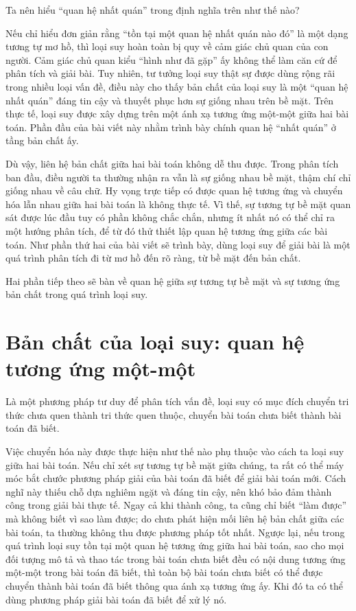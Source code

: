\documentclass[11pt]{article}
\begin{document}
Ta nên hiểu ``quan hệ nhất quán'' trong định nghĩa trên như thế nào?

Nếu chỉ hiểu đơn giản rằng ``tồn tại một quan hệ nhất quán nào đó'' là một
dạng tương tự mơ hồ, thì loại suy hoàn toàn bị quy về cảm giác chủ quan của
con người. Cảm giác chủ quan kiểu ``hình như đã gặp'' ấy không thể làm căn cứ
để phân tích và giải bài. Tuy nhiên, tư tưởng loại suy thật sự được dùng rộng
rãi trong nhiều loại vấn đề, điều này cho thấy bản chất của loại suy là một
``quan hệ nhất quán'' đáng tin cậy và thuyết phục hơn sự giống nhau trên bề
mặt. Trên thực tế, loại suy được xây dựng trên một ánh xạ tương ứng một-một
giữa hai bài toán. Phần đầu của bài viết này nhằm trình bày chính quan hệ
``nhất quán'' ở tầng bản chất ấy.

Dù vậy, liên hệ bản chất giữa hai bài toán không dễ thu được. Trong phân tích
ban đầu, điều người ta thường nhận ra vẫn là sự giống nhau bề mặt, thậm chí
chỉ giống nhau về câu chữ. Hy vọng trực tiếp có được quan hệ tương ứng và
chuyển hóa lẫn nhau giữa hai bài toán là không thực tế. Vì thế, sự tương tự
bề mặt quan sát được lúc đầu tuy có phần không chắc chắn, nhưng ít nhất nó có
thể chỉ ra một hướng phân tích, để từ đó thử thiết lập quan hệ tương ứng giữa
các bài toán. Như phần thứ hai của bài viết sẽ trình bày, dùng loại suy để
giải bài là một quá trình phân tích đi từ mơ hồ đến rõ ràng, từ bề mặt đến
bản chất.

Hai phần tiếp theo sẽ bàn về quan hệ giữa sự tương tự bề mặt và sự tương ứng
bản chất trong quá trình loại suy.

\section{Bản chất của loại suy: quan hệ tương ứng một-một}

Là một phương pháp tư duy để phân tích vấn đề, loại suy có mục đích chuyển tri
thức chưa quen thành tri thức quen thuộc, chuyển bài toán chưa biết thành bài
toán đã biết.

Việc chuyển hóa này được thực hiện như thế nào phụ thuộc vào cách ta loại suy
giữa hai bài toán. Nếu chỉ xét sự tương tự bề mặt giữa chúng, ta rất có thể
máy móc bắt chước phương pháp giải của bài toán đã biết để giải bài toán mới.
Cách nghĩ này thiếu chỗ dựa nghiêm ngặt và đáng tin cậy, nên khó bảo đảm
thành công trong giải bài thực tế. Ngay cả khi thành công, ta cũng chỉ biết
``làm được'' mà không biết vì sao làm được; do chưa phát hiện mối liên hệ bản
chất giữa các bài toán, ta thường không thu được phương pháp tốt nhất. Ngược
lại, nếu trong quá trình loại suy tồn tại một quan hệ tương ứng giữa hai bài
toán, sao cho mọi đối tượng mô tả và thao tác trong bài toán chưa biết đều có
nội dung tương ứng một-một trong bài toán đã biết, thì toàn bộ bài toán chưa
biết có thể được chuyển thành bài toán đã biết thông qua ánh xạ tương ứng ấy.
Khi đó ta có thể dùng phương pháp giải bài toán đã biết để xử lý nó.
\end{document}
